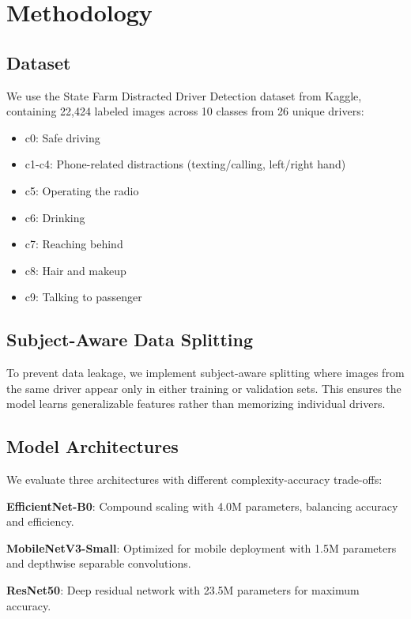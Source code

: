 \documentclass[conference]{IEEEtran}
\begin{document}
\section{Methodology}

\subsection{Dataset}

We use the State Farm Distracted Driver Detection dataset from Kaggle, containing 22,424 labeled images across 10 classes from 26 unique drivers:

\begin{itemize}
    \item c0: Safe driving
    \item c1-c4: Phone-related distractions (texting/calling, left/right hand)
    \item c5: Operating the radio
    \item c6: Drinking
    \item c7: Reaching behind
    \item c8: Hair and makeup
    \item c9: Talking to passenger
\end{itemize}

\subsection{Subject-Aware Data Splitting}

To prevent data leakage, we implement subject-aware splitting where images from the same driver appear only in either training or validation sets. This ensures the model learns generalizable features rather than memorizing individual drivers.

\subsection{Model Architectures}

We evaluate three architectures with different complexity-accuracy trade-offs:

\textbf{EfficientNet-B0}: Compound scaling with 4.0M parameters, balancing accuracy and efficiency.

\textbf{MobileNetV3-Small}: Optimized for mobile deployment with 1.5M parameters and depthwise separable convolutions.

\textbf{ResNet50}: Deep residual network with 23.5M parameters for maximum accuracy.
\end{document}
